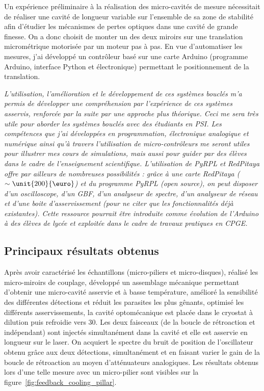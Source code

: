 \documentclass[12pt,a4paper]{article}
\begin{document}
Un expérience préliminaire à la réalisation des micro-cavités de mesure nécessitait de réaliser une cavité de longueur variable sur l'ensemble de sa zone de stabilité afin d'étudier les mécanismes de pertes optiques dans une cavité de grande finesse.
On a donc choisit de monter un des deux miroirs sur une translation micrométrique motorisée par un moteur pas à pas.
En vue d'automatiser les mesures, j'ai développé un contrôleur basé sur une carte Arduino (programme Arduino, interface Python et électronique) permettant le positionnement de la translation.

\textit{L'utilisation, l'amélioration et le développement de ces systèmes bouclés m'a permis de développer une compréhension par l'expérience de ces systèmes asservis, renforcée par la suite par une approche plus théorique.
Ceci me sera très utile pour aborder les systèmes bouclés avec des étudiants en PSI.
Les compétences que j'ai développées en programmation, électronique analogique et numérique ainsi qu'à travers l'utilisation de micro-contrôleurs me seront utiles pour illustrer mes cours de simulations, mais aussi pour guider par des élèves dans le cadre de l'enseignement scientifique.
L'utilisation de PyRPL et RedPitaya offre par ailleurs de nombreuses possibilités : grâce à une carte RedPitaya ($\sim\unit{200}{\text{\euro}}$) et du programme PyRPL (open source), on peut disposer d'un oscilloscope, d'un GBF, d'un analyseur de spectre, d'un analyseur de réseau et d'une boite d'asservissement (pour ne citer que les fonctionnalités déjà existantes).
Cette ressource pourrait être introduite comme évolution de l'Arduino à des élèves de lycée et exploitée dans le cadre de travaux pratiques en CPGE.}

\subsection{Principaux résultats obtenus}

Après avoir caractérisé les échantillons (micro-piliers et micro-disques), réalisé les micro-miroirs de couplage, développé un assemblage mécanique permettant d'obtenir une micro-cavité asservie et à basse température, amélioré la sensibilité des différentes détections et réduit les parasites les plus gênants, optimisé les différents asservissements, la cavité optomécanique est placée dans le cryostat à dilution puis refroidie vers \unit{30}{\milli\kelvin}.
Les deux faisceaux (de la boucle de rétroaction et indépendant) sont injectés simultanément dans la cavité et elle est asservie en longueur sur le laser.
On acquiert le spectre du bruit de position de l'oscillateur obtenu grâce aux deux détections, simultanément et en faisant varier le gain de la boucle de rétroaction au moyen d'atténuateurs analogiques.
Les résultats obtenus lors d'une telle mesure avec un micro-pilier sont visibles sur la figure~\ref{fig:feedback_cooling_pillar}.
\end{document}
